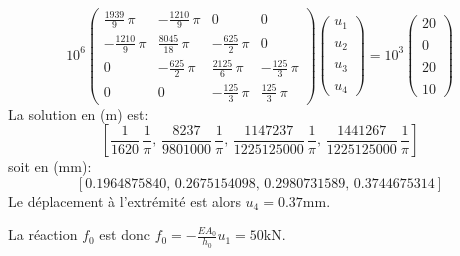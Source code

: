 \documentclass[a4paper]{article}
\begin{document}
\[
10^{6}\left(
{\begin{array}{cccc}
{\displaystyle \frac {1939}{9}} \,\pi  &  - {\displaystyle 
\frac {1210}{9}} \,\pi  & 0 & 0 \\ [2ex]
 - {\displaystyle \frac {1210}{9}} \,\pi  & {\displaystyle 
\frac {8045}{18}} \,\pi  &  - {\displaystyle \frac {625}{2}} 
\,\pi  & 0 \\ [2ex]
0 &  - {\displaystyle \frac {625}{2}} \,\pi  & {\displaystyle 
\frac {2125}{6}} \,\pi  &  - {\displaystyle \frac {125}{3}} \,
\pi  \\ [2ex]
0 & 0 &  - {\displaystyle \frac {125}{3}} \,\pi  & 
{\displaystyle \frac {125}{3}} \,\pi 
\end{array}}
 \right) \left(\begin{array}{l} 
u _{1}\\ \\u _{2}\\ \\u _{3}\\ \\u _{4}
\end{array}\right)=10^{3}\left(\begin{array}{l} 
20\\ \\0\\ \\20\\ \\10
\end{array}\right)
\]
La solution en (m) est:
\[
 \left[  \! {\displaystyle \frac {1}{1620}} \,{\displaystyle 
\frac {1}{\pi }} , \,{\displaystyle \frac {8237}{9801000}} \,
{\displaystyle \frac {1}{\pi }} , \,{\displaystyle \frac {1147237
}{1225125000}} \,{\displaystyle \frac {1}{\pi }} , \,{\displaystyle 
\frac {1441267}{1225125000}} \,{\displaystyle \frac {1}{\pi }}  \! 
 \right] 
\]
soit en (mm):
\[
[0.1964875840,\,0.2675154098,\,0.2980731589,\,0.3744675314]
\]
Le déplacement à l'extrémité est alors $u _4=0.37$mm.

La réaction $f_0$ est donc $f_0=-\frac{EA_0}{h_0}u _1=50$kN.
\end{document}
